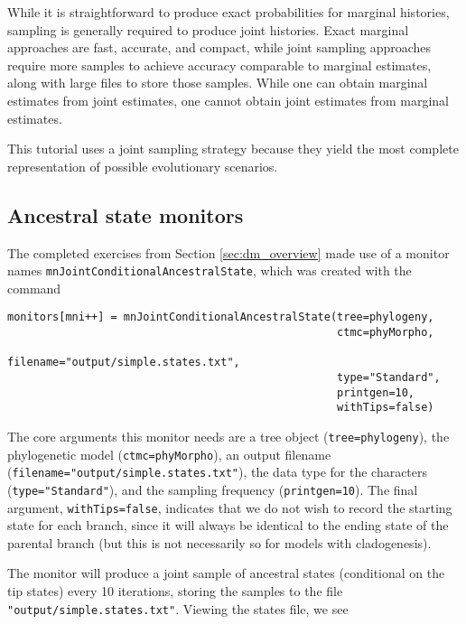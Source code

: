 While it is straightforward to produce exact probabilities for marginal histories, sampling is generally required to produce joint histories.
Exact marginal approaches are fast, accurate, and compact, while joint sampling approaches require more samples to achieve accuracy comparable to marginal estimates, along with large files to store those samples.
While one can obtain marginal estimates from joint estimates, one cannot obtain joint estimates from marginal estimates.

This tutorial uses a joint sampling strategy because they yield the most complete representation of possible evolutionary scenarios.

\subsection{Ancestral state monitors}

The completed exercises from Section \ref{sec:dm_overview} made use of a monitor names {\tt mnJointConditionalAncestralState}, which was created with the command

{\tt \begin{snugshade*}
\begin{lstlisting}
monitors[mni++] = mnJointConditionalAncestralState(tree=phylogeny,
                                                   ctmc=phyMorpho,
                                                   filename="output/simple.states.txt",
                                                   type="Standard",
                                                   printgen=10,
                                                   withTips=false)
\end{lstlisting}
\end{snugshade*}}

The core arguments this monitor needs are a tree object ({\tt tree=phylogeny}), the phylogenetic model ({\tt ctmc=phyMorpho}), an output filename ({\tt filename="output/simple.states.txt"}), the data type for the characters ({\tt type="Standard"}), and the sampling frequency ({\tt printgen=10}).
The final argument, {\tt withTips=false}, indicates that we do not wish to record the starting state for each branch, since it will always be identical to the ending state of the parental branch (but this is not necessarily so for models with cladogenesis).

The monitor will produce a joint sample of ancestral states (conditional on the tip states) every 10 iterations, storing the samples to the file {\tt "output/simple.states.txt"}.
Viewing the states file, we see

